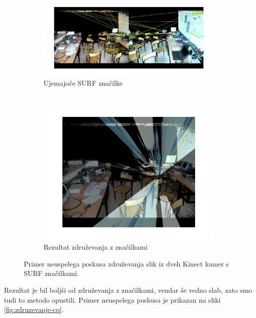 \begin{figure}[!htb]
	\centering
	\begin{subfigure}[t]{0.45\columnwidth}
		\includegraphics[width=\columnwidth]{./Slike/matched-features.png}
		\caption{Ujemajoče SURF značilke}
		\label{fig:zdruzevanje-surf}
	\end{subfigure}
	~
	\begin{subfigure}[t]{0.45\columnwidth}
		\includegraphics[width=\columnwidth]{./Slike/features-calibration-result.png}
		\caption{Rezultat združevanja z značilkami}
		\label{fig:zdruzevanje-result}
	\end{subfigure}
	\caption{Primer neuspelega poskusa združevanja slik iz dveh Kinect kamer s SURF značilkami.}
	\label{fig:zdruzevanje-znacilke}
\end{figure}

 Rezultat je bil boljši od združevanja z značilkami, vendar še vedno slab, zato smo tudi to metodo opustili. Primer neuspelega poskusa je prikazan na sliki \ref{fig:zdruzevanje-cp}.
 
